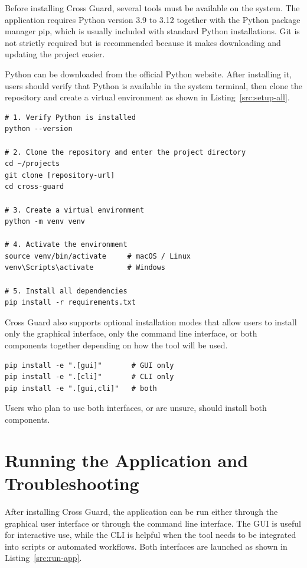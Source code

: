 Before installing Cross Guard, several tools must be available on the system. The application requires Python version 3.9 to 3.12 together with the Python package manager pip, which is usually included with standard Python installations. Git is not strictly required but is recommended because it makes downloading and updating the project easier.

Python can be downloaded from the official Python website. After installing it, users should verify that Python is available in the system terminal, then clone the repository and create a virtual environment as shown in Listing~\ref{src:setup-all}.

\begin{lstlisting}[caption={Complete setup: verify Python, clone the repository, create and activate a virtual environment, and install dependencies}, label=src:setup-all, basicstyle=\ttfamily\small, breaklines=true]
# 1. Verify Python is installed
python --version

# 2. Clone the repository and enter the project directory
cd ~/projects
git clone [repository-url]
cd cross-guard

# 3. Create a virtual environment
python -m venv venv

# 4. Activate the environment
source venv/bin/activate     # macOS / Linux
venv\Scripts\activate        # Windows

# 5. Install all dependencies
pip install -r requirements.txt
\end{lstlisting}

Cross Guard also supports optional installation modes that allow users to install only the graphical interface, only the command line interface, or both components together depending on how the tool will be used.

\begin{lstlisting}[caption={Optional installation modes}, basicstyle=\ttfamily\small]
pip install -e ".[gui]"       # GUI only
pip install -e ".[cli]"       # CLI only
pip install -e ".[gui,cli]"   # both
\end{lstlisting}

Users who plan to use both interfaces, or are unsure, should install both components.

\section{Running the Application and Troubleshooting}
\label{sec:running}

After installing Cross Guard, the application can be run either through the graphical user interface or through the command line interface. The GUI is useful for interactive use, while the CLI is helpful when the tool needs to be integrated into scripts or automated workflows. Both interfaces are launched as shown in Listing~\ref{src:run-app}.

